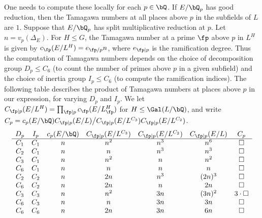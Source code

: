\begin{example}
    One needs to compute these locally for each $p \in \bQ$. If $E / \bQ_p$ has good reduction, then the Tamagawa numbers at all places above $p$ in the subfields of $L$ are $1$. Suppose that $E / \bQ_p$ has split multiplicative reduction at $p$. Let $n = v_p(\Delta_E)$. For $H \leq G$, the Tamagawa number at a prime $\fp$ above $p$ in $L^H$ is given by $c_{\fp}(E / L^H) = e_{\fp / p} n$, where $e_{\fp \mid p}$ is the ramification degree. Thus the computation of Tamagawa numbers depends on the choice of decomposition group $D_p \leq C_6$ (to count the number of primes above $p$ in a given subfield) and the choice of inertia group $I_p \leq C_6$ (to compute the ramification indices). The following table describes the product of Tamagawa numbers at places above $p$ in our expression, for varying $D_p$ and $I_p$. We let $C_{\fp \mid p}(E / L^H) = \prod_{\fp \mid p}c_{\fp}(E / L^H_{\fp})$ for $H \leq \Gal(L / \bQ)$, and write $C_p = c_p(E / \bQ)C_{\fp \mid p}(E / L) \big/ C_{\fp \mid p}(E / L^{C_3})C_{\fp \mid p}(E / L^{C_2})$. 
    \[
    \begin{array}{c c c c c c c}
        D_p & I_p & c_p(E / \bQ) & C_{\fp \mid p}(E / L^{C_3}) & C_{\fp \mid p}(E / L^{C_2}) & C_{\fp \mid p}(E / L) & C_p\\ 
        \hline
        C_1 & C_1 & n & n^2 & n^3 & n^6 & \square\\
        C_2 & C_1 & n & n & n^3 & n^3 & \square\\
        C_3 & C_1 & n & n^2 & n & n^2 & \square \\
        C_6 & C_1 & n & n & n & n & \square \\
        C_2 & C_2 & n & 2n & n^3 & (2n)^3 & \square \\
        C_6 & C_2 & n & 2n & n & 2n & \square \\
        C_3 & C_3 & n & n^2 & 3n & (3n)^2 & 3\cdot\square \\
        C_6 & C_3 & n & n & 3n & 3n & \square\\
        C_6 & C_6 & n & 2n & 3n & 6n & \square
    \end{array}
    \]


\end{example}
